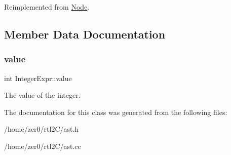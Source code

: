 Reimplemented from \hyperlink{class_node_a3e67ec8d22182b721717af14fe0c3000}{Node}.



\subsection{Member Data Documentation}
\mbox{\label{class_integer_expr_af5c4493d7da142825995867fa592c490}} 
\subsubsection{\texorpdfstring{value}{value}}
{\footnotesize\ttfamily int Integer\+Expr\+::value\hspace{0.3cm}{\ttfamily [protected]}}

The value of the integer. 

The documentation for this class was generated from the following files\+:\begin{DoxyCompactItemize}
\item 
/home/zer0/rtl2\+C/ast.\+h\item 
/home/zer0/rtl2\+C/ast.\+cc\end{DoxyCompactItemize}

